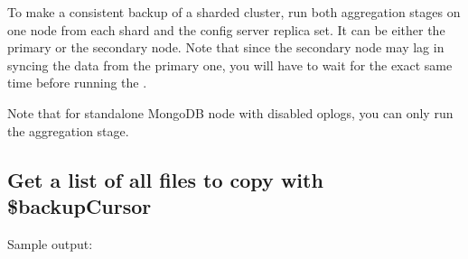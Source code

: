 \documentclass[letterpaper,10pt,english]{sphinxmanual}
\begin{document}
\sphinxAtStartPar
To make a consistent backup of a sharded cluster, run both aggregation stages on one node from each shard and the config server replica set. It can be either the primary or the secondary node. Note that since the secondary node may lag in syncing the data from the primary one, you will have to wait for the exact same time before running the .

\sphinxAtStartPar
Note that for standalone MongoDB node with disabled oplogs, you can only run the  aggregation stage.


\subsection{Get a list of all files to copy with \$backupCursor}
\label{\detokenize{backup-cursor:get-a-list-of-all-files-to-copy-with-backupcursor}}
\begin{sphinxVerbatim}[commandchars=\\\{\}]
\PYG{p}{[}\PYG{p}{]}
\end{sphinxVerbatim}

\sphinxAtStartPar
Sample output:
\end{document}
